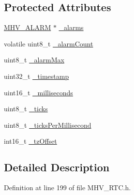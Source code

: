 \subsection*{\-Protected \-Attributes}
\begin{DoxyCompactItemize}
\item 
\hyperlink{_m_h_v___r_t_c_8h_af13307658f41fba330ffae04dd5cbce6}{\-M\-H\-V\-\_\-\-A\-L\-A\-R\-M} $\ast$ \hyperlink{class_m_h_v___r_t_c_afaaed6deea21b52f8bde5f8ebc0abf70}{\-\_\-alarms}
\item 
volatile uint8\-\_\-t \hyperlink{class_m_h_v___r_t_c_a953a79952c9fa5fde5d1dacbc03d3b46}{\-\_\-alarm\-Count}
\item 
uint8\-\_\-t \hyperlink{class_m_h_v___r_t_c_aed7d37466a99362b78dd9ccf1390d35c}{\-\_\-alarm\-Max}
\item 
uint32\-\_\-t \hyperlink{class_m_h_v___r_t_c_a6ac0d6f1b8985cd6113249693da50104}{\-\_\-timestamp}
\item 
uint16\-\_\-t \hyperlink{class_m_h_v___r_t_c_acd3e486b5e5ee1d8cf9d961c0fdbde57}{\-\_\-milliseconds}
\item 
uint8\-\_\-t \hyperlink{class_m_h_v___r_t_c_ab29c30f80f7234394299476c73f36baf}{\-\_\-ticks}
\item 
uint8\-\_\-t \hyperlink{class_m_h_v___r_t_c_a48e7d03e90e78881ed8833d6e4f77b36}{\-\_\-ticks\-Per\-Millisecond}
\item 
int16\-\_\-t \hyperlink{class_m_h_v___r_t_c_af9e544307713892ec196261247213490}{\-\_\-tz\-Offset}
\end{DoxyCompactItemize}


\subsection{\-Detailed \-Description}


\-Definition at line 199 of file \-M\-H\-V\-\_\-\-R\-T\-C.\-h.




